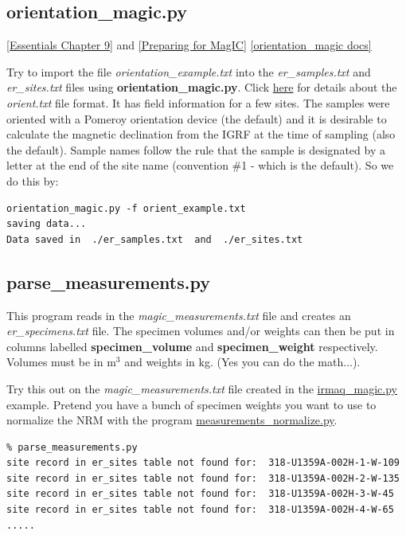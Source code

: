 \documentclass[11pt]{book}
\begin{document}
{{ \subsection{orientation\_magic.py}
 \href{http://earthref.org/MAGIC/books/Tauxe/Essentials/WebBook3ch9.html#ch9}{[Essentials Chapter 9]} and \href{#field_info}{[Preparing for MagIC]}
 \href{https://github.com/PmagPy/PmagPy/blob/master/programs/orientation_magic.py}{[orientation\_magic docs]}


  Try to import the file {\it orientation\_example.txt} into the {\it er\_samples.txt} and {\it er\_sites.txt} files using {\bf orientation\_magic.py}.  Click \href{#field_info}{here}  for details about the {\it orient.txt} file format.  It has field information for a few sites.  The samples were oriented with a Pomeroy orientation device  (the default) and it is desirable to calculate the magnetic declination from the IGRF at the time of sampling (also the default).  Sample names follow the rule that the sample is designated by a letter at the end of the site name (convention \#1 - which is the default).  So we do this by:

  \begin{verbatim}
orientation_magic.py -f orient_example.txt
saving data...
Data saved in  ./er_samples.txt  and  ./er_sites.txt

\end{verbatim}

%

\subsection{parse\_measurements.py}

This program reads in the {\it magic\_measurements.txt} file and creates an {\it er\_specimens.txt} file.   The specimen volumes and/or weights can then be put in columns labelled {\bf specimen\_volume} and {\bf specimen\_weight} respectively.  Volumes must be in m$^3$ and weights in kg.  (Yes you can do the math...).

Try this out on the {\it magic\_measurements.txt} file created in the \href{#irmaq_magic.py}{irmaq\_magic.py} example.  Pretend you have a bunch of specimen weights you want to use to normalize the NRM with the program \href{#measurements_normalize.py}{measurements\_normalize.py}.

\begin{verbatim}
% parse_measurements.py
site record in er_sites table not found for:  318-U1359A-002H-1-W-109
site record in er_sites table not found for:  318-U1359A-002H-2-W-135
site record in er_sites table not found for:  318-U1359A-002H-3-W-45
site record in er_sites table not found for:  318-U1359A-002H-4-W-65
.....
\end{verbatim}

}}
\end{document}
